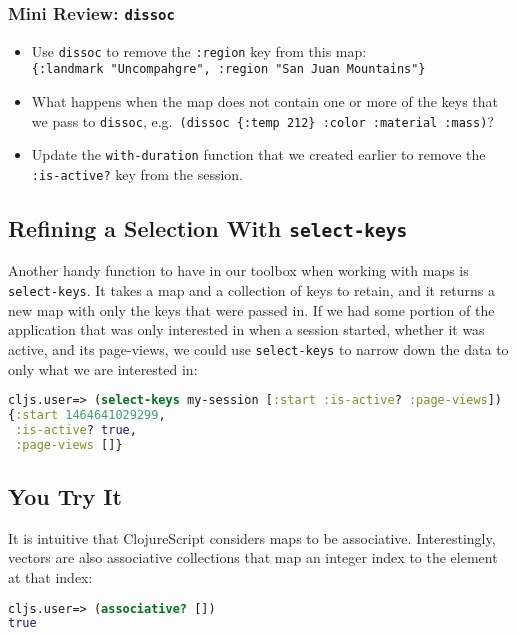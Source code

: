 \documentclass[10pt,twoside,openright]{memoir}
\begin{document}
\subsubsection{Mini Review: \texttt{dissoc}}

\begin{itemize}
\tightlist
\item
  Use \texttt{dissoc} to remove the \texttt{:region} key from this map:
  \texttt{\{:landmark\ "Uncompahgre",\ :region\ "San\ Juan\ Mountains"\}}
\item
  What happens when the map does not contain one or more of the keys
  that we pass to \texttt{dissoc},
  e.g.~\texttt{(dissoc\ \{:temp\ 212\}\ :color\ :material\ :mass)}?
\item
  Update the \texttt{with-duration} function that we created earlier to
  remove the \texttt{:is-active?} key from the session.
\end{itemize}


\subsection{Refining a Selection With \texttt{select-keys}}

Another handy function to have in our toolbox when working with maps is
\texttt{select-keys}. It takes a map and a collection of keys to retain,
and it returns a new map with only the keys that were passed in. If we
had some portion of the application that was only interested in when a
session started, whether it was active, and its page-views, we could use
\texttt{select-keys} to narrow down the data to only what we are
interested in:

\begin{lstlisting}[language=Clojure]
cljs.user=> (select-keys my-session [:start :is-active? :page-views])
{:start 1464641029299,
 :is-active? true,
 :page-views []}
\end{lstlisting}


\subsection{You Try It}

It is intuitive that ClojureScript considers maps to be associative.
Interestingly, vectors are also associative collections that map an
integer index to the element at that index:

\begin{lstlisting}[language=Clojure]
cljs.user=> (associative? [])
true
\end{lstlisting}
\end{document}
